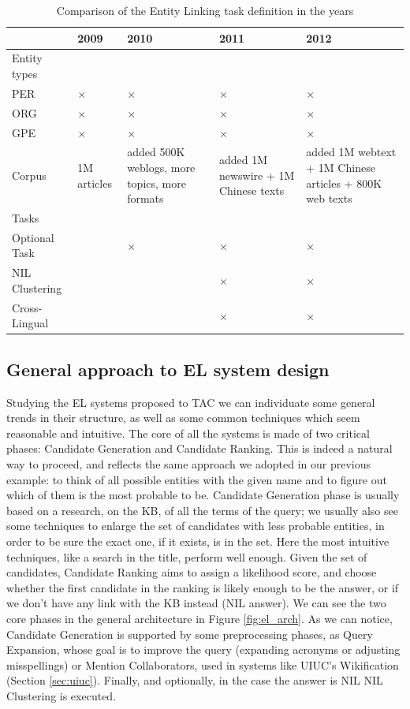 \documentclass[a4paper,11pt]{report}
\newcommand{\tick}{$\times$}
\begin{document}
\begin{table}
\begin{tabularx}{\linewidth}{lXXXX}
 & 2009 & 2010 & 2011 & 2012 \\
\hline Entity types \\ 
  PER & \tick & \tick & \tick & \tick \\
  ORG & \tick & \tick & \tick & \tick \\
  GPE & \tick & \tick & \tick & \tick \\
\hline Corpus & 1M articles & added 500K weblogs, more topics, more formats & added 1M newswire + 1M Chinese texts & added 1M webtext + 1M Chinese articles + 800K web texts\\
\hline Tasks\\ 
Optional Task & & \tick & \tick & \tick \\
NIL Clustering & & & \tick & \tick \\
Cross-Lingual  & & & \tick & \tick \\
 
 
\end{tabularx}
\caption{Comparison of the Entity Linking task definition in the years}
\label{tab:el}
\end{table}
\subsection{General approach to EL system design}
Studying the EL systems proposed to TAC we can individuate some general trends in their structure, as well as some common techniques which seem reasonable and intuitive.
The core of all the systems is made of two critical phases: Candidate Generation and Candidate Ranking. This is indeed a natural way to proceed, and reflects the same approach we adopted in our previous example: to think of all possible entities with the given name and to figure out which of them is the most probable to be.
Candidate Generation phase is usually based on a research, on the KB, of all the terms of the query; we usually also see some techniques to enlarge the set of candidates with less probable entities, in order to be sure the exact one, if it exists, is in the set. Here the most intuitive techniques, like a search in the title, perform well enough.
Given the set of candidates, Candidate Ranking aims to assign a likelihood score, and choose whether the first candidate in the ranking is likely enough to be the answer, or if we don't have any link with the KB instead (NIL answer).
We can see the two core phases in the general architecture in Figure \ref{fig:el_arch}. As we can notice, Candidate Generation is supported by some preprocessing phases, as Query Expansion, whose goal is to improve the query (expanding acronyms or adjusting misspellings) or Mention Collaborators, used in systems like UIUC's Wikification (Section \ref{sec:uiuc}). %
 Finally, and optionally, in the case the answer is NIL NIL Clustering is executed.
 
\end{document}
